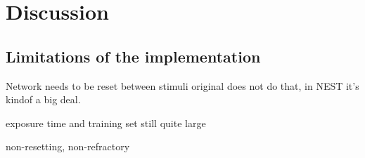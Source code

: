 
\chapter{Discussion}


\section{Limitations of the implementation}

Network needs to be reset between stimuli
    original does not do that, in NEST it's kindof a big deal.

exposure time and training set still quite large

non-resetting, non-refractory

